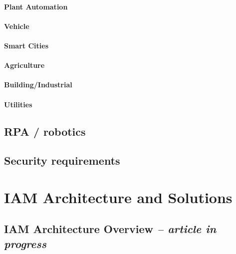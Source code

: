 \hypertarget{plant-automation}{%
\subsubsection{Plant Automation}\label{plant-automation}}

\hypertarget{vehicle}{%
\subsubsection{Vehicle}\label{vehicle}}

\hypertarget{smart-cities}{%
\subsubsection{Smart Cities}\label{smart-cities}}

\hypertarget{agriculture}{%
\subsubsection{Agriculture}\label{agriculture}}

\hypertarget{buildingindustrial}{%
\subsubsection{Building/Industrial}\label{buildingindustrial}}

\hypertarget{utilities}{%
\subsubsection{Utilities}\label{utilities}}

\hypertarget{rpa-robotics}{%
\section{RPA / robotics}\label{rpa-robotics}}

\hypertarget{security-requirements}{%
\section{Security requirements}\label{security-requirements}}

\hypertarget{iam-architecture-and-solutions}{%
\chapter{IAM Architecture and Solutions
}\label{iam-architecture-and-solutions}}

\hypertarget{iam-architecture-overview-article-in-progress}{%
\section{\texorpdfstring{IAM Architecture Overview \emph{-- article
in
progress}}{IAM Architecture Overview -- article in progress}}\label{iam-architecture-overview-article-in-progress}}

